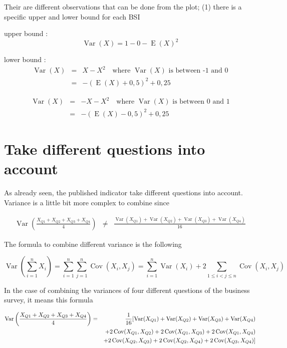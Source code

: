\documentclass[12pt,a4paper,oneside]{book}
\DeclareMathOperator{\Var}{Var}
\DeclareMathOperator{\Cov}{Cov}
\DeclareMathOperator{\E}{E}
\begin{document}
Their are different observations that can be done from the plot;
(1) there is a specific upper and lower bound for each BSI

upper bound : 
\begin{equation}
    \Var(X) = 1 - 0 - \E(X)^2
\end{equation}

lower bound : 
\begin{eqnarray}
\Var(X) &=& X - X^2 \quad \text{where } \Var(X) \text{ is between -1 and 0} \\
    &=& - (\E(X) + 0,5)^2 + 0,25 
\end{eqnarray}

\begin{eqnarray}
    \Var(X) &=& - X - X^2 \quad \text{where } \Var(X) \text{ is between 0 and 1} \\
        &=&  - (\E(X) - 0,5)^2 + 0,25
\end{eqnarray}
    

\section{Take different questions into account}

As already seen, the published indicator take different questions into account. 
Variance is a little bit more complex to combine since

\begin{eqnarray}
    \Var \left(\frac{X_{Q1} + X_{Q2} + X_{Q3} + X_{Q4}}{4} \right) &\neq&
    \frac{\Var(X_{Q1}) + \Var(X_{Q2}) + \Var(X_{Q3}) + \Var(X_{Q4})}{16} \nonumber
\end{eqnarray}

The formula to combine different variance is the following

\begin{equation}
\Var \left(\sum_{i=1}^{n} X_{i}\right) = \sum_{i=1}^{n} \sum_{j=1}^{n} \Cov\left(X_{i}, X_{j}\right)
= \sum_{i=1}^{n} \Var\left(X_{i}\right)+2 \sum_{1 \leq i<j \leq n} \Cov\left(X_{i}, X_{j}\right)
\end{equation}

In the case of combining the variances of four different questions of the business survey, it means this formula

\begin{eqnarray}
    \Var \left(\frac{X_{Q1} + X_{Q2} + X_{Q3} + X_{Q4}}{4} \right) &=& \frac{1}{16} \large[ \Var(X_{Q1}) + \Var(X_{Q2}) + \Var(X_{Q3}) + \Var(X_{Q4}) \nonumber \\
    && + 2 \Cov (X_{Q1},X_{Q2}) + 2 \Cov (X_{Q1},X_{Q3}) + 2 \Cov (X_{Q1},X_{Q4}) \nonumber \\
    &&  + 2 \Cov (X_{Q2},X_{Q3}) + 2 \Cov (X_{Q2},X_{Q4}) + 2 \Cov (X_{Q3},X_{Q4}) \large] \nonumber
\end{eqnarray}
\end{document}
